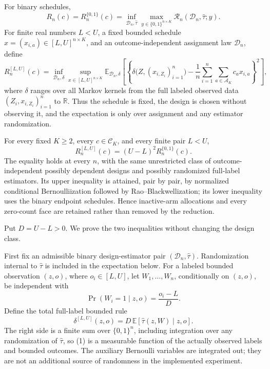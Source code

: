 For binary schedules,
\[
R_n(c)=R_n^{\{0,1\}}(c)
=\inf_{\mathcal D_n,\widehat\tau}
\max_{y\in\{0,1\}^{n\times K}}
\mathcal R_n(\mathcal D_n,\widehat\tau;y).
\]
For finite real numbers \(L<U\), a fixed bounded schedule \(x=(x_{i,a})\in[L,U]^{n\times K}\), and an outcome-independent assignment law \(\mathcal D_n\), define
\[
R_n^{[L,U]}(c)
=\inf_{\mathcal D_n,\delta}
\sup_{x\in[L,U]^{n\times K}}
\mathbb E_{\mathcal D_n,\delta}
\left[
\left\{
\delta\bigl(Z,(x_{i,Z_i})_{i=1}^n\bigr)
-\frac1n\sum_{i=1}^n\sum_{a\in\mathcal A_K}c_ax_{i,a}
\right\}^{2}
\right],
\]
where \(\delta\) ranges over all Markov kernels from the full labeled observed data \((Z_i,x_{i,Z_i})_{i=1}^n\) to \(\mathbb R\).  Thus the schedule is fixed, the design is chosen without observing it, and the expectation is only over assignment and any estimator randomization.

For every fixed \(K\ge2\), every \(c\in\mathcal C_K\), and every finite pair \(L<U\),
\[
R_n^{[L,U]}(c)=(U-L)^2R_n^{\{0,1\}}(c).
\]
The equality holds at every \(n\), with the same unrestricted class of outcome-independent possibly dependent designs and possibly randomized full-label estimators.  Its upper inequality is attained, pair by pair, by normalized conditional Bernoulliization followed by Rao--Blackwellization; its lower inequality uses the binary endpoint schedules.  Hence inactive-arm allocations and every zero-count face are retained rather than removed by the reduction.

Put \(D=U-L>0\).  We prove the two inequalities without changing the design class.

First fix an admissible binary design-estimator pair \((\mathcal D_n,\widehat\tau)\).  Randomization internal to \(\widehat\tau\) is included in the expectation below.  For a labeled bounded observation \((z,o)\), where \(o_i\in[L,U]\), let \(W_1,\ldots,W_n\), conditionally on \((z,o)\), be independent with
\[
\Pr(W_i=1\mid z,o)=\frac{o_i-L}{D}.
\]
Define the total full-label bounded rule
\[
\delta^{[L,U]}(z,o)
=D\,\mathbb E\!\left[\widehat\tau(z,W)\mid z,o\right].
\tag{1}
\]
The right side is a finite sum over \(\{0,1\}^n\), including integration over any randomization of \(\widehat\tau\), so (1) is a measurable function of the actually observed labels and bounded outcomes.  The auxiliary Bernoulli variables are integrated out; they are not an additional source of randomness in the implemented experiment.

